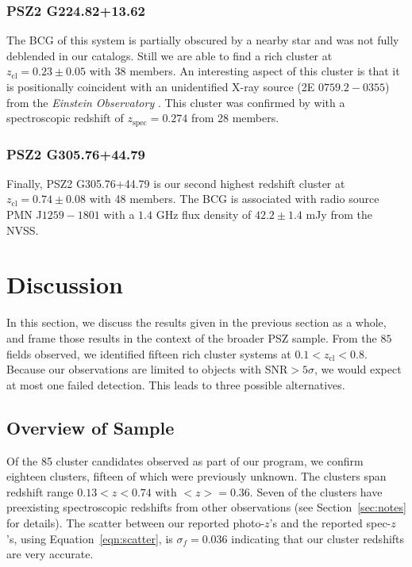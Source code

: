 \documentclass[apj, revtex4-1]{emulateapj}
\begin{document}
\subsubsection{PSZ2 G224.82+13.62} %
The BCG of this system is partially obscured by a nearby star and was not fully deblended in our catalogs. Still we are able to find a rich cluster at $z_\mathrm{cl} = 0.23 \pm 0.05$ with 38 members. An interesting aspect of this cluster is that it is positionally coincident with an unidentified X-ray source (2E $0759.2-0355$) from the \textit{Einstein Observatory} \citep{Harris1990}. This cluster was confirmed by \cite{Barrena2018} with a spectroscopic redshift of $z_\mathrm{spec} = 0.274$ from 28 members.

\subsubsection{PSZ2 G305.76+44.79} %
Finally, PSZ2 G305.76+44.79 is our second highest redshift cluster at $z_\mathrm{cl} = 0.74 \pm 0.08$ with 48 members. The BCG is associated with radio source PMN J$1259-1801$ with a $1.4$ GHz flux density of $42.2\pm 1.4$ mJy from the NVSS.


\section{Discussion}\label{sec:discussion}
In this section, we discuss the results given in the previous section as a whole, and frame those results in the context of the broader PSZ sample. From the $85$ fields observed, we identified fifteen rich cluster systems at $0.1 < z_\mathrm{cl} < 0.8$. Because our observations are limited to objects with SNR$>5\sigma$, we would expect at most one failed detection. This leads to three possible alternatives.

\subsection{Overview of Sample}
Of the 85 cluster candidates observed as part of our program, we confirm eighteen clusters, fifteen of which were previously unknown. The clusters span redshift range $ 0.13 < z < 0.74$ with $<z> = 0.36$. Seven of the clusters have preexisting spectroscopic redshifts from other observations (see Section~\ref{sec:notes} for details). The scatter between our reported photo-$z$'s and the reported spec-$z$'s, using Equation~\ref{eqn:scatter}, is $\sigma_f = 0.036$ indicating that our cluster redshifts are very accurate.
\end{document}
